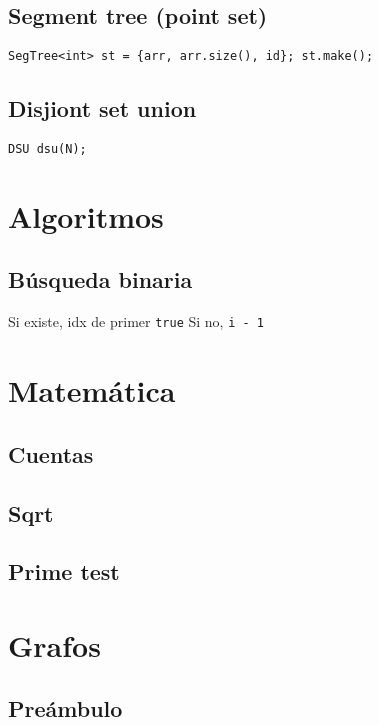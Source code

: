     \subsection{Segment tree (point set)}
        \texttt{SegTree<int> st = \{arr, arr.size(), id\}; st.make();}

    \subsection{Disjiont set union}
        \texttt{DSU dsu(N);}


\section{Algoritmos}
    \subsection{Búsqueda binaria}
        Si existe, idx de primer \texttt{true}
        Si no, \texttt{i - 1}


\section{Matemática}
    \subsection{Cuentas}

    \subsection{Sqrt}

    \subsection{Prime test}
        
\section{Grafos}
    \subsection{Preámbulo}
        
